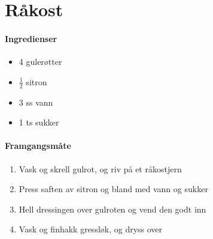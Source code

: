 \section{﻿Råkost}


\paragraph{Ingredienser}
\begin{itemize}[noitemsep]
	\item 4 gulerøtter
	\item $\frac{1}{2}$  sitron
	\item 3 ss vann
	\item 1 ts sukker
\end{itemize}

\paragraph{Framgangsmåte}
\begin{enumerate}[noitemsep]
	\item Vask og skrell gulrot, og riv på et råkostjern
	\item Press saften av sitron og bland med vann og sukker
	\item Hell dressingen over gulroten og vend den godt inn
	\item Vask og finhakk gressløk, og dryss over
\end{enumerate}
